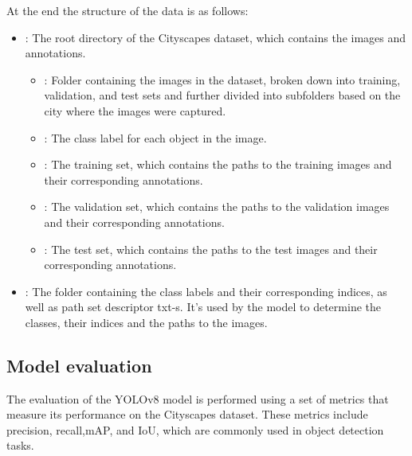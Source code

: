 At the end the structure of the data is as follows:
\begin{itemize}
    \item {}: The root directory of the Cityscapes dataset, which contains the images and annotations.
    \begin{itemize}
        \item {}: Folder containing the images in the dataset, broken down into training, validation, and test sets
    and further divided into subfolders based on the city where the images were captured.
        \item {}: The class label for each object in the image.
        \item {}: The training set, which contains the paths to the training images and their corresponding annotations.
        \item {}: The validation set, which contains the paths to the validation images and their corresponding annotations.
        \item {}: The test set, which contains the paths to the test images and their corresponding annotations.
    \end{itemize}
    \item {}: The folder containing the class labels and their corresponding indices, as well as
    path set descriptor txt-s.
    It's used by the model to determine the classes, their indices and the paths to the images.
\end{itemize}

\subsection{Model evaluation}\label{subsec:model-evaluation}
The evaluation of the YOLOv8 model is performed using a set of metrics that measure its performance on the Cityscapes dataset.
These metrics include precision, recall,mAP, and IoU, which are commonly used in object detection tasks.